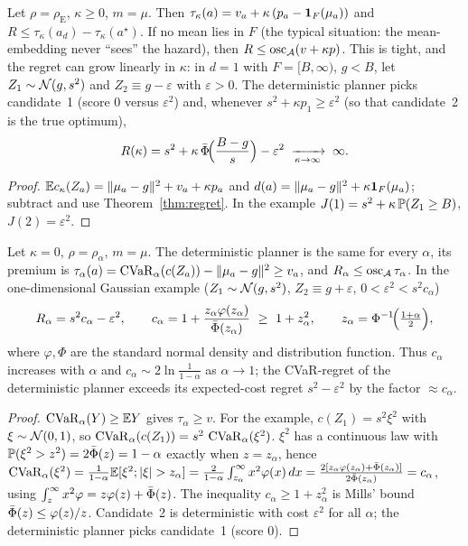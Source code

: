 \begin{corollary}\label{cor:fail}
Let $\rho=\rho_{\mathrm E}$, $\kappa\ge0$, $m=\mu$. Then $\tau_\kappa(a)=v_a+\kappa\,(p_a-\mathbf 1_F(\mu_a))$ and
$R\le\tau_\kappa(a_d)-\tau_\kappa(a^\star)$. If no mean lies in $F$ (the typical situation: the mean-embedding never ``sees'' the hazard), then $R\le\operatorname{osc}_{\mathcal A}(v+\kappa p)$.
This is tight, and the regret can grow linearly in $\kappa$: in $d=1$ with $F=[B,\infty)$, $g<B$, let $Z_1\sim\mathcal{N}(g,s^2)$ and $Z_2\equiv g-\varepsilon$ with $\varepsilon>0$.
The deterministic planner picks candidate~1 (score $0$ versus $\varepsilon^2$) and, whenever $s^2+\kappa p_1\ge\varepsilon^2$ (so that candidate~2 is the true optimum),
\[
R(\kappa)=s^2+\kappa\,\bar\Phi\!\Bigl(\frac{B-g}{s}\Bigr)-\varepsilon^2 \;\xrightarrow[\kappa\to\infty]{}\;\infty .
\]
\end{corollary}
\begin{proof}
$\mathbb{E} c_\kappa(Z_a)=\|\mu_a-g\|^2+v_a+\kappa p_a$ and $d(a)=\|\mu_a-g\|^2+\kappa\mathbf 1_F(\mu_a)$; subtract and use Theorem~\ref{thm:regret}.
In the example $J(1)=s^2+\kappa\,\mathbb{P}(Z_1\ge B)$, $J(2)=\varepsilon^2$.
\end{proof}

\begin{corollary}\label{cor:cvar}
Let $\kappa=0$, $\rho=\rho_\alpha$, $m=\mu$. The deterministic planner is the same for every $\alpha$, its premium is $\tau_\alpha(a)=\operatorname{CVaR}_\alpha(c(Z_a))-\|\mu_a-g\|^2\ge v_a$, and $R_\alpha\le\operatorname{osc}_{\mathcal A}\tau_\alpha$.
In the one-dimensional Gaussian example ($Z_1\sim\mathcal{N}(g,s^2)$, $Z_2\equiv g+\varepsilon$, $0<\varepsilon^2<s^2c_\alpha$)
\[
R_\alpha=s^2c_\alpha-\varepsilon^2,\qquad c_\alpha=1+\frac{z_\alpha\varphi(z_\alpha)}{\Phibar(z_\alpha)}\ \ge\ 1+z_\alpha^2,\qquad z_\alpha=\Phi^{-1}\!\Bigl(\tfrac{1+\alpha}{2}\Bigr),
\]
where $\varphi,\Phi$ are the standard normal density and distribution function.
Thus $c_\alpha$ increases with $\alpha$ and $c_\alpha\sim 2\ln\frac1{1-\alpha}$ as $\alpha\to1$; the CVaR-regret of the deterministic planner exceeds its expected-cost regret $s^2-\varepsilon^2$ by the factor $\approx c_\alpha$.
\end{corollary}
\begin{proof}
$\operatorname{CVaR}_\alpha(Y)\ge\mathbb{E} Y$ gives $\tau_\alpha\ge v$. For the example, $c(Z_1)=s^2\xi^2$ with $\xi\sim\mathcal{N}(0,1)$, so $\operatorname{CVaR}_\alpha(c(Z_1))=s^2\,\operatorname{CVaR}_\alpha(\xi^2)$.
$\xi^2$ has a continuous law with $\mathbb{P}(\xi^2>z^2)=2\bar\Phi(z)=1-\alpha$ exactly when $z=z_\alpha$, hence $\CVaR_\alpha(\xi^2)=\frac{1}{1-\alpha}\EE[\xi^2;|\xi|>z_\alpha]=\frac{2}{1-\alpha}\int_{z_\alpha}^\infty x^2\varphi(x)\,dx=\frac{2[z_\alpha\varphi(z_\alpha)+\Phibar(z_\alpha)]}{2\Phibar(z_\alpha)}=c_\alpha$, using $\int_z^\infty x^2\varphi=z\varphi(z)+\bar\Phi(z)$.
The inequality $c_\alpha\ge1+z_\alpha^2$ is Mills' bound $\bar\Phi(z)\le\varphi(z)/z$. Candidate~2 is deterministic with cost $\varepsilon^2$ for all $\alpha$; the deterministic planner picks candidate~1 (score $0$).
\end{proof}

